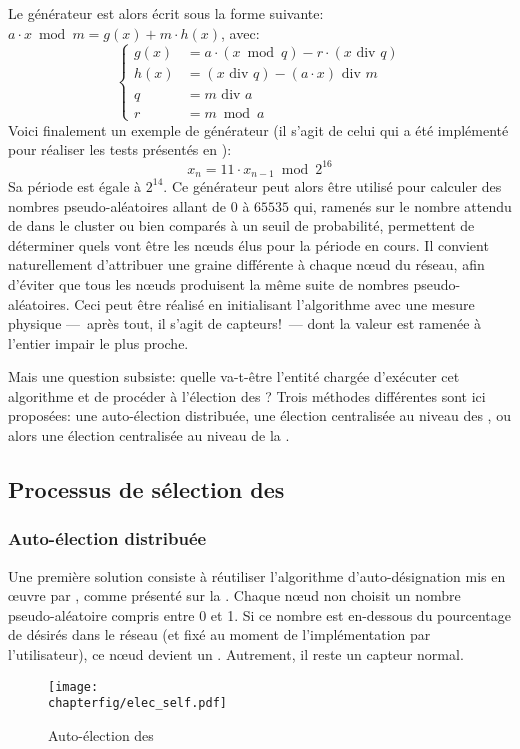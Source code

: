Le générateur est alors écrit sous la forme suivante: $a\cdot x\bmod m=g(x)+m\cdot h(x)$, avec:
\[\left\{
    \begin{aligned}
        g(x) & =a\cdot(x\bmod q)-r\cdot(x\mbox{~div~}q)\\
        h(x) & =(x\mbox{~div~}q)-(a\cdot x)\mbox{~div~}m\\
        q    & =m\mbox{~div~}a\\
        r    & =m\bmod a
    \end{aligned}
\right.\]
Voici finalement un exemple de générateur (il s'agit de celui qui a été implémenté pour réaliser les tests présentés en ):
\[x_n=11\cdot x_{n-1}\bmod2^{16}\]
Sa période est égale à $2^{14}$.
Ce générateur peut alors être utilisé pour calculer des nombres pseudo-aléatoires allant de $0$ à $65535$ qui, ramenés sur le nombre attendu de \cns dans le cluster ou bien comparés à un seuil de probabilité, permettent de déterminer quels vont être les nœuds élus pour la période en cours.
Il convient naturellement d'attribuer une graine différente à chaque nœud du réseau, afin d'éviter que tous les nœuds produisent la même suite de nombres pseudo-aléatoires.
Ceci peut être réalisé en initialisant l'algorithme avec une mesure physique ---~après tout, il s'agit de capteurs!~--- dont la valeur est ramenée à l'entier impair le plus proche.

Mais une question subsiste: quelle va-t-être l'entité chargée d'exécuter cet algorithme et de procéder à l'élection des \cns?
Trois méthodes différentes sont ici proposées: une auto-élection distribuée, une élection centralisée au niveau des \CH, ou alors une élection centralisée au niveau de la \sdb.
    \subsection{Processus de sélection des \cns}

        \subsubsection{Auto-élection distribuée}
Une première solution consiste à réutiliser l'algorithme d'auto-désignation mis en œuvre par \leach, comme présenté sur la .
Chaque nœud non \CH choisit un nombre pseudo-aléatoire compris entre 0 et 1.
Si ce nombre est en-dessous du pourcentage de \cns désirés dans le réseau (et fixé au moment de l'implémentation par l'utilisateur), ce nœud devient un \cn.
Autrement, il reste un capteur normal.
\begin{figure}[ht]
    \centering
    \texttt{[image: \\chapterfig/elec\_self.pdf]}
    \caption{Auto-élection des \cns}\label{sa:fig:elecself}
\end{figure}

